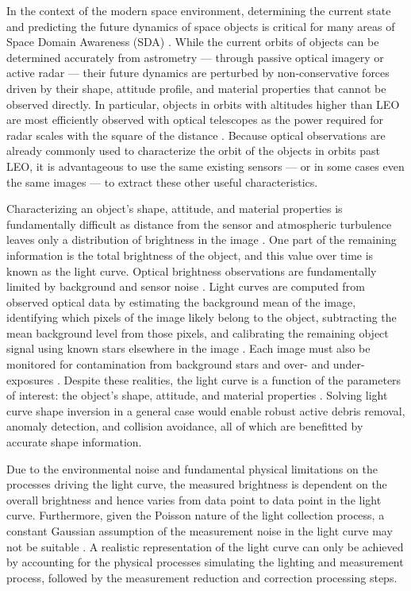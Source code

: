 In the context of the modern space environment, determining the current state and predicting the future dynamics of space objects is critical for many areas of Space Domain Awareness (SDA) \cite{frueh2019notes}. While the current orbits of objects can be determined accurately from astrometry --- through passive optical imagery or active radar --- their future dynamics are perturbed by non-conservative forces driven by their shape, attitude profile, and material properties that cannot be observed directly. In particular, objects in orbits with altitudes higher than LEO are most efficiently observed with optical telescopes as the power required for radar scales with the square of the distance \cite{frueh2019notes}. Because optical observations are already commonly used to characterize the orbit of the objects in orbits past LEO, it is advantageous to use the same existing sensors --- or in some cases even the same images --- to extract these other useful characteristics. 

Characterizing an object's shape, attitude, and material properties is fundamentally difficult as distance from the sensor and atmospheric turbulence leaves only a distribution of brightness in the image \cite{fan2020thesis}. One part of the remaining information is the total brightness of the object, and this value over time is known as the light curve. Optical brightness observations are fundamentally limited by background and sensor noise \cite{frueh2019notes}. Light curves are computed from observed optical data by estimating the background mean of the image, identifying which pixels of the image likely belong to the object, subtracting the mean background level from those pixels, and calibrating the remaining object signal using known stars elsewhere in the image \cite{schildknecht2008}. Each image must also be monitored for contamination from background stars and over- and under-exposures \cite{schildknecht2015}. Despite these realities, the light curve is a function of the parameters of interest: the object's shape, attitude, and material properties \cite{fan2020thesis, burton2021mapping}. Solving light curve shape inversion in a general case would enable robust active debris removal, anomaly detection, and collision avoidance, all of which are benefitted by accurate shape information.

Due to the environmental noise and fundamental physical limitations on the processes driving the light curve, the measured brightness is dependent on the overall brightness and hence varies from data point to data point in the light curve. Furthermore, given the Poisson nature of the light collection process, a constant Gaussian assumption of the measurement noise in the light curve may not be suitable \cite{fan2020thesis, krag2003}. A realistic representation of the light curve can only be achieved by accounting for the physical processes simulating the lighting and measurement process, followed by the measurement reduction and correction processing steps. 

